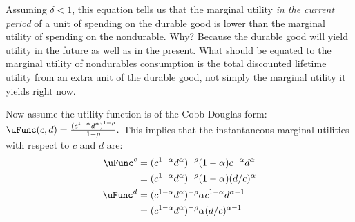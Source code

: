 \documentclass{handout}
\begin{document}
Assuming $\delta<1$, this equation tells us that the marginal utility 
{\it in the current period} of a unit of spending on the durable good 
is lower than the marginal utility of spending on the nondurable.  
Why?  Because the durable good will yield utility in the future as 
well as in the present.  What should be equated to the marginal 
utility of nondurables consumption is the total discounted lifetime 
utility from an extra unit of the durable good, not simply the 
marginal utility it yields right now.


Now assume the utility function is of the Cobb-Douglas form: $\uFunc(c,d)=\frac{({%
c^{1-\alpha }d^{\alpha })}^{1-\rho }}{1-\rho }.$  This implies that the
instantaneous marginal utilities with respect to $c$ and $d$ are:
\begin{equation}\begin{gathered}\begin{aligned}
        \uFunc^{c} & =  (c^{1-\alpha}d^{\alpha})^{-\rho} 
        (1-\alpha)c^{-\alpha}d^{\alpha}  \\
                   & =   (c^{1-\alpha}d^{\alpha})^{-\rho} (1-\alpha)(d/c)^{\alpha}
\\        \uFunc^{d} & =  (c^{1-\alpha}d^{\alpha})^{-\rho} \alpha c^{1-\alpha} 
        d^{\alpha-1} \\
              & =  (c^{1-\alpha}d^{\alpha})^{-\rho}  \alpha (d/c)^{\alpha-1}
\end{aligned}\end{gathered}\end{equation}
\end{document}
